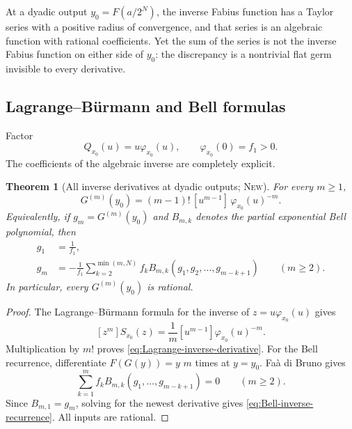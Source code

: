 \documentclass[11pt,oneside]{article}
\theoremstyle{frontier}
\newtheorem{theorem}{Theorem}[section]
\theoremstyle{definition}
\theoremstyle{remark}
\newcommand{\InvF}{G}
\newcommand{\statusnew}{\textsc{New}}
\begin{document}
\begin{resultbox}
At a dyadic output $y_0=F(a/2^N)$, the inverse Fabius function has a Taylor series with a positive
radius of convergence, and that series is an algebraic function with rational coefficients.  Yet the
sum of the series is not the inverse Fabius function on either side of $y_0$: the discrepancy is a
nontrivial flat germ invisible to every derivative.
\end{resultbox}

\subsection{Lagrange--B\"urmann and Bell formulas}

Factor
\begin{equation}
 Q_{x_0}(u)=u\varphi_{x_0}(u),
 \qquad
 \varphi_{x_0}(0)=f_1>0.
 \label{eq:Q-phi}
\end{equation}
The coefficients of the algebraic inverse are completely explicit.

\begin{theorem}[All inverse derivatives at dyadic outputs; \statusnew]
\label{thm:inverse-derivatives}
For every $m\ge1$,
\begin{equation}
 \boxed{
 \InvF^{(m)}(y_0)
 =(m-1)!\,[u^{m-1}]\,\varphi_{x_0}(u)^{-m}.
 }
 \label{eq:Lagrange-inverse-derivative}
\end{equation}
Equivalently, if $g_m=\InvF^{(m)}(y_0)$ and $B_{m,k}$ denotes the partial exponential Bell
polynomial, then
\begin{align}
 g_1&=\frac1{f_1},
 \label{eq:g1}\\
 g_m&=-\frac1{f_1}
 \sum_{k=2}^{\min(m,N)}f_k
 B_{m,k}(g_1,g_2,\ldots,g_{m-k+1})
 \qquad(m\ge2).
 \label{eq:Bell-inverse-recurrence}
\end{align}
In particular, every $\InvF^{(m)}(y_0)$ is rational.
\end{theorem}

\begin{proof}
The Lagrange--B\"urmann formula for the inverse of $z=u\varphi_{x_0}(u)$ gives
\[
 [z^m]S_{x_0}(z)=\frac1m[u^{m-1}]\varphi_{x_0}(u)^{-m}.
\]
Multiplication by $m!$ proves \eqref{eq:Lagrange-inverse-derivative}.  For the Bell recurrence,
differentiate $F(\InvF(y))=y$ $m$ times at $y=y_0$.  Fa\`a di Bruno gives
\[
 \sum_{k=1}^{m} f_k B_{m,k}(g_1,\ldots,g_{m-k+1})=0\qquad(m\ge2).
\]
Since $B_{m,1}=g_m$, solving for the newest derivative gives
\eqref{eq:Bell-inverse-recurrence}.  All inputs are rational.
\end{proof}
\end{document}
